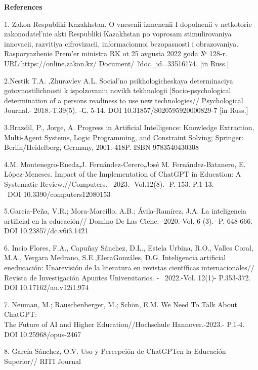 \begin{center}
	{\bfseries References}
\end{center}
\begin{noparindent}

1. Zakon Respubliki Kazakhstan. O vnesenii izmenenii I dopolnenii v
netkotorie zakonodatel'nie akti Respubliki Kazakhstan po voprosam
stimulirovaniya innovacii, razvitiya cifrovizacii, informacionnoi
bezopasnosti i obrazovaniya. Rasporyazhenie Prem'er ministra RK ot 25
avgusta 2022 goda № 128-r. URL:https://online.zakon.kz/ Document/
?doc\_id=33516174. {[}in Russ.{]}

2.Nestik T.A. ,Zhuravlev A.L. Social'no psikhologicheskaya determinaciya
gotovnostilichnosti k ispolzovaniu novikh tekhnologii
{[}Socio-psychological determination of a person\textquotesingle s
readiness to use new technologies// Psychological Journal.-
2018.-Т.39(5). -С. 5-14. DOI 10.31857/S020595920000829-7 {[}in Russ.{]}

3.Brazdil, P., Jorge, A. Progress in Artificial Intelligence: Knowledge
Extraction, Multi-Agent Systems, Logic Programming, and Constraint
Solving; Springer: Berlin/Heidelberg, Germany, 2001.-418P. ISBN
9783540430308

4.M. Montenegro-Rueda{\bfseries ,}J. Fernández-Cerero{\bfseries ,}José M.
Fernández-Batanero, E. López-Meneses. Impact of the Implementation of
ChatGPT in Education: A Systematic Review.//Computers.-\emph{~}2023.-
Vol.12(8).- P. 153.-P.1-13. \\~DOI 10.3390/computers12080153

5.García-Peña, V.R.; Mora-Marcillo, A.B.; Ávila-Ramírez, J.A. La
inteligencia artificial en la educación// Domino De Las Cienc.
-2020.-Vol. 6 (3).- P. 648-666. DOI 10.23857/dc.v6i3.1421

6. Incio Flores, F.A., Capuñay Sánchez, D.L., Estela Urbina, R.O.,
Valles Coral, M.A., Vergara Medrano, S.E.,EleraGonzáles, D.G.
Inteligencia artificial eneducación: Unarevisión de la literatura en
revistas científicas internacionales// \\Revista de Investigación Apuntes
Universitarios. - ~2022.-Vol. 12(1)- P.353-372. DOI
10.17162/au.v12i1.974

7. Neuman, M.; Rauschenberger, M.; Schön, E.M. We Need To Talk About
ChatGPT:\\The Future of AI and Higher Education//Hochschule
Hannover.-2023.- P.1-4. DOI 10.25968/opus-2467

8. García Sánchez, O.V. Uso y Percepción de ChatGPTen la Educación
Superior// RITI Journal


\end{noparindent}
